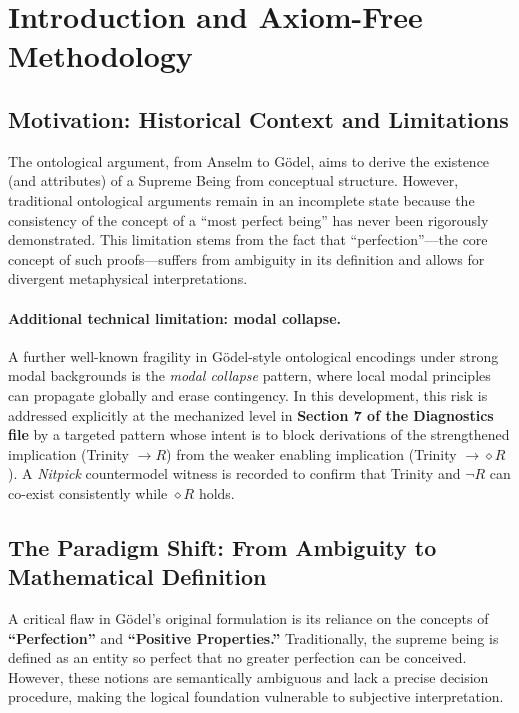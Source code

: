 \documentclass[a4paper, 11pt]{article}
\theoremstyle{plain}
\theoremstyle{definition}
\begin{document}
\tableofcontents
\newpage


\section{Introduction and Axiom-Free Methodology}
\label{sec:intro}

\subsection{Motivation: Historical Context and Limitations}
The ontological argument, from Anselm to G\"odel, aims to derive the existence (and attributes) of a Supreme Being from conceptual structure. However, traditional ontological arguments remain in an incomplete state because the consistency of the concept of a ``most perfect being'' has never been rigorously demonstrated. This limitation stems from the fact that ``perfection''---the core concept of such proofs---suffers from ambiguity in its definition and allows for divergent metaphysical interpretations.

\paragraph{Additional technical limitation: modal collapse.}
A further well-known fragility in G\"odel-style ontological encodings under strong modal backgrounds is the \emph{modal collapse} pattern, where local modal principles can propagate globally and erase contingency. In this development, this risk is addressed explicitly at the mechanized level in \textbf{Section 7 of the Diagnostics file} by a targeted pattern whose intent is to block derivations of the strengthened implication (Trinity $\rightarrow R$) from the weaker enabling implication (Trinity $\rightarrow \diamond R$). A \textit{Nitpick} countermodel witness is recorded to confirm that Trinity and $\neg R$ can co-exist consistently while $\diamond R$ holds.

\subsection{The Paradigm Shift: From Ambiguity to Mathematical Definition}
A critical flaw in G\"odel's original formulation is its reliance on the concepts of \textbf{``Perfection''} and \textbf{``Positive Properties.''} Traditionally, the supreme being is defined as an entity so perfect that no greater perfection can be conceived. However, these notions are semantically ambiguous and lack a precise decision procedure, making the logical foundation vulnerable to subjective interpretation.
\end{document}
